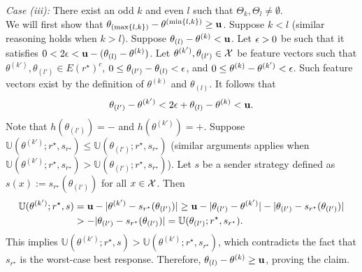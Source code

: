 \begin{apdxproof}
\noindent \textit{Case (iii): }{There exist an odd $k$ and even $l$ such that $\Theta_k, \Theta_l \neq \emptyset$.}\\
We will first show that $\theta_{(\max\{l,k\})} - \theta^{(\min\{l,k\})} \geq \mathbf{u}$. Suppose $k < l$ (similar reasoning holds when $k>l$).
Suppose $\theta_{(l)} - \theta^{(k)} < \mathbf{u}$. Let $\epsilon >0$ be such that it satisfies $0 < 2\epsilon < \mathbf{u} - (\theta_{(l)} - \theta^{(k)})$. Let $\theta^{(k')}, \theta_{(l')} \in \mathcal{X}$ be feature vectors such that $\theta^{(k')}, \theta_{(l')} \in E(r^\star)^c$,  $0 \leq \theta_{(l')} - \theta_{(l)} < \epsilon$, and $0 \leq \theta^{(k)} - \theta^{(k')} < \epsilon$.  Such feature vectors exist by the definition of $\theta^{(k)}$ and $\theta_{(l)}$. It follows that 
$$\theta_{(l')} - \theta^{(k')} < 2\epsilon + \theta_{(l)} - \theta^{(k)} < \mathbf{u}.$$ Note that $h(\theta_{(l')}) = \minus$ and $h(\theta^{(k')}) = \plus$. Suppose $\mathbb{U}(\theta^{(k')};r^\star,s_{r^\star}) \leq \mathbb{U}(\theta_{(l')};r^\star,s_{r^\star})$ (similar arguments applies when $\mathbb{U}(\theta^{(k')};r^\star,s_{r^\star}) > \mathbb{U}(\theta_{(l')};r^\star,s_{r^\star})$).
Let $s$ be a sender strategy defined as $s(x) := s_{r^\star}(\theta_{(l')})$ for all $x \in \mathcal{X}$. Then  
\begin{equation*}
    \begin{aligned}
    \mathbb{U}(\theta^{(k')}; r^\star, s) &= \mathbf{u} - |\theta^{(k')} -s_{r^\star}(\theta_{(l')})| \geq   \mathbf{u} - |\theta_{(l')} - \theta^{(k')}|- |\theta_{(l')} - s_{r^\star}(\theta_{(l')})| \\
    &> -|\theta_{(l')} - s_{r^\star}(\theta_{(l')})| = \mathbb{U}(\theta_{(l')};r^\star,s_{r^\star}).
    \end{aligned}
\end{equation*}
This implies 
$\mathbb{U}(\theta^{(k')};r^\star,s) > \mathbb{U}(\theta^{(k')};r^\star,s_{r^\star})$, which contradicts the fact that $s_{r^\star}$ is the worst-case best response. Therefore, $\theta_{(l)} - \theta^{(k)} \geq \mathbf{u}$, proving the claim.


\end{apdxproof}
